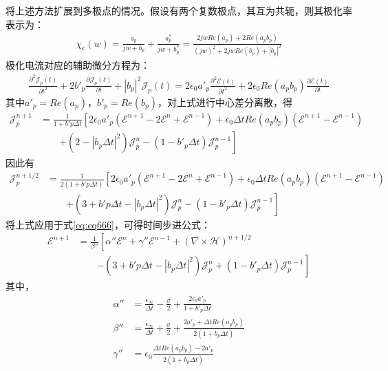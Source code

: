 \documentclass{article}
\numberwithin{equation}{section}
\renewcommand{\vec}[1]{\boldsymbol{#1}}
\begin{document}
将上述方法扩展到多极点的情况。假设有两个复数极点，其互为共轭，则其极化率表示为：
\begin{align}
    \label{eq:eq683}
    \chi_e(w)=\frac{a_p}{jw+b_p}+\frac{a_p^*}{jw+b_p^*}=\frac{2jwRe(a_p)+2Re(a_pb_p)}{(jw)^2+2jwRe(b_p)+|b_p|^2}
\end{align}
极化电流对应的辅助微分方程为：
\begin{align}
    \label{eq:eq684}
    \frac{\partial^2 \vec{\mathcal{J}}_p(t)}{\partial t^2}+2b'_p\frac{\partial \vec{\mathcal{J}}_p(t)}{\partial t}+|b_p|^2\vec{\mathcal{J}}_p(t)=2\epsilon_0a'_p\frac{\partial^2 \vec{\mathcal{E}}(t)}{\partial t^2}+2\epsilon_0Re(a_pb_p)\frac{\partial \vec{\mathcal{E}}(t)}{\partial t}
\end{align}
其中$a'_p=Re(a_p)$，$b'_p=Re(b_p)$，对上式进行中心差分离散，得
\begin{align}
    \label{eq:eq685}
    \vec{\mathcal{J}}_p^{n+1}&=\frac{1}{1+b'p\Delta t}\left[2\epsilon_0a'_p(\vec{\mathcal{E}}^{n+1}-2\vec{\mathcal{E}}^{n}+\vec{\mathcal{E}}^{n-1})+\epsilon_0\Delta tRe(a_pb_p)(\vec{\mathcal{E}}^{n+1}-\vec{\mathcal{E}}^{n-1})\right. \nonumber \\
                             &\qquad\left.+\left(2-\left|b_p\Delta t\right|^2\right)\vec{\mathcal{J}}_p^{n}-(1-b'_p\Delta t)\vec{\mathcal{J}}_p^{n-1}\right]
\end{align}
因此有
\begin{align}
    \label{eq:eq686}
    \vec{\mathcal{J}}_p^{n+1/2}&=\frac{1}{2(1+b'p\Delta t)}\left[2\epsilon_0a'_p(\vec{\mathcal{E}}^{n+1}-2\vec{\mathcal{E}}^{n}+\vec{\mathcal{E}}^{n-1})+\epsilon_0\Delta tRe(a_pb_p)(\vec{\mathcal{E}}^{n+1}-\vec{\mathcal{E}}^{n-1})\right. \nonumber \\
                               &\qquad\left.+\left(3+b'p\Delta t-\left|b_p\Delta t\right|^2\right)\vec{\mathcal{J}}_p^{n}-(1-b'_p\Delta t)\vec{\mathcal{J}}_p^{n-1}\right]
\end{align}
将上式应用于式\ref{eq:eq666}，可得时间步进公式：
\begin{align}
    \label{eq:eq687}
    \vec{\mathcal{E}}^{n+1}&=\frac{1}{\beta''}\left[\alpha''\vec{\mathcal{E}}^{n}+\gamma''\vec{\mathcal{E}}^{n-1}+(\nabla\times\vec{\mathcal{H}})^{n+1/2}\right. \nonumber \\
                           &\qquad\left.-\left(3+b'p\Delta t-\left|b_p\Delta t\right|^2\right)\vec{\mathcal{J}}_p^{n}+(1-b'_p\Delta t)\vec{\mathcal{J}}_p^{n-1}\right]
\end{align}
其中，
\begin{align}
    \label{eq:eq688}
    \alpha''&=\frac{\epsilon_{\infty}}{\Delta t}-\frac{\sigma}{2}+\frac{2\epsilon_0a'_p}{1+b'_p\Delta t} \\
    \beta''&=\frac{\epsilon_{\infty}}{\Delta t}+\frac{\sigma}{2}+\frac{2a'_p+\Delta tRe(a_pb_p)}{2(1+b_p\Delta t)} \\
    \gamma''&=\epsilon_0\frac{\Delta tRe(a_pb_p)-2a'_p}{2(1+b_p\Delta t)}
\end{align}
\end{document}
